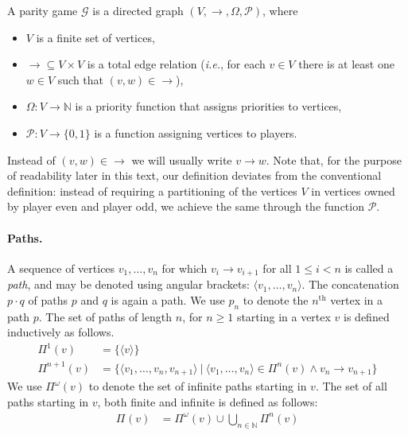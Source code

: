 \documentclass[a4paper]{llncs}
\newcommand{\ie}{\textit{i.e.}\xspace}
\newcommand{\N}{\ensuremath{\mathbb{N}}\xspace}
\newcommand{\game}{\ensuremath{\mathcal{G}}\xspace}
\newcommand{\even}{\ensuremath{0}\xspace}
\newcommand{\odd}{\ensuremath{1}\xspace}
\newcommand{\priority}{\ensuremath{\Omega}\xspace}
\newcommand{\getplayername}{\ensuremath{\mathcal{P}}}
\newcommand{\prefixes}[3][]{\ensuremath{\Pi_{#2}^{#1}(#3)}}
\newcommand{\path}[1]{\ensuremath{\langle #1 \rangle}}
\newcommand{\pathconcat}{\cdot}
\begin{document}
\begin{definition}
A parity game $\game$ is a directed graph $(V, \to, \priority, \getplayername)$,
where 
\begin{itemize}
\item $V$ is a finite set of vertices,
\item $\to \subseteq V \times V$ is a total edge relation (\ie, for each
$v\in V$ there is at least one $w \in V$ such that $(v, w) \in \to$),

\item $\Omega: V \to \N$ is a priority function that assigns priorities to vertices,

\item $\getplayername: V \to \{\even, \odd\}$ is a function assigning vertices
to players.

\end{itemize}
\end{definition}
Instead of $(v, w) \in \to$ we will usually write $v \to w$.  Note that,
for the purpose of readability later in this text, our definition
deviates from the conventional definition: instead of requiring a
partitioning of the vertices $V$ in vertices owned by player even 
and player odd, we achieve the same
through the function $\getplayername$. 

\paragraph{Paths.} A sequence of vertices $v_1, \ldots, v_n$ for which
$v_i \to v_{i+1}$ for all $1 \leq i < n$ is called a \emph{path}, and
may be denoted using angular brackets: $\path{v_1, \ldots, v_n}$. The
concatenation $p \pathconcat q$ of paths $p$ and $q$ is again a path. We
use $p_n$ to denote the $n^\textrm{th}$ vertex in a path $p$. The set of
paths of length $n$, for $n \ge 1$ starting in a vertex $v$ is defined
inductively as follows.
\begin{align*}
\prefixes[1]{}{v} & = \{ \path{v} \} \\
\prefixes[n+1]{}{v} & = \{ \path{v_1,\ldots,v_n,v_{n+1}}
~|~ \path{v_1,\ldots,v_n} \in \prefixes[n]{}{v} \land v_n \to v_{n+1} \}
\end{align*}
We use $\prefixes[\omega]{}{v}$ to denote the set of infinite paths
starting in $v$. The set of all paths starting in $v$, both finite and
infinite is defined as follows:
\begin{align*}
\prefixes{}{v} & = \prefixes[\omega]{}{v} \cup \bigcup_{n \in \N} \prefixes[n]{}{v} \\
\end{align*}
\end{document}
